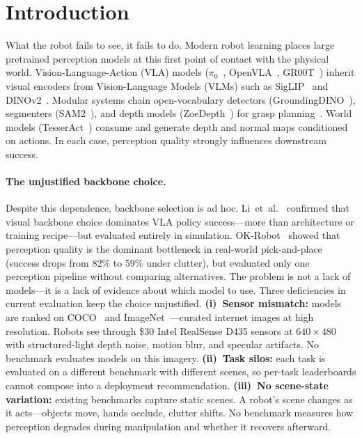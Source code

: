 \section{Introduction}
\label{sec:intro}

\noindent
What the robot fails to see, it fails to do.
Modern robot learning places large pretrained perception models at this first point of contact with the physical world.
Vision-Language-Action (VLA) models ($\pi_0$~\citep{black2024pi0}, OpenVLA~\citep{kim2024openvla}, GR00T~\citep{bjorck2025gr00t}) inherit visual encoders from Vision-Language Models (VLMs) such as SigLIP~\citep{zhai2023siglip} and DINOv2~\citep{oquab2023dinov2}.
Modular systems chain open-vocabulary detectors (GroundingDINO~\citep{liu2024groundingDINO}), segmenters (SAM2~\citep{ravi2024sam2}), and depth models (ZoeDepth~\citep{bhat2023zoedepth}) for grasp planning~\citep{liu2024okrobot, ze2024dp3}.
World models (TesserAct~\citep{zhen2025tesseract}) consume and generate depth and normal maps conditioned on actions.
In each case, perception quality strongly influences downstream success.

\paragraph{The unjustified backbone choice.}
Despite this dependence, backbone selection is ad hoc.
Li~et~al.~\citep{li2025robovlms} confirmed that visual backbone choice dominates VLA policy success---more than architecture or training recipe---but evaluated entirely in simulation.
OK-Robot~\citep{liu2024okrobot} showed that perception quality is the dominant bottleneck in real-world pick-and-place (success drops from 82\% to 59\% under clutter), but evaluated only one perception pipeline without comparing alternatives.
The problem is not a lack of models---it is a lack of evidence about which model to use.
Three deficiencies in current evaluation keep the choice unjustified.
\textbf{(i)~Sensor mismatch:} models are ranked on COCO~\citep{lin2014coco} and ImageNet~\citep{deng2009imagenet}---curated internet images at high resolution. Robots see through \$30 Intel RealSense D435 sensors at $640\!\times\!480$ with structured-light depth noise, motion blur, and specular artifacts. No benchmark evaluates models on this imagery.
\textbf{(ii)~Task silos:} each task is evaluated on a different benchmark with different scenes, so per-task leaderboards cannot compose into a deployment recommendation.
\textbf{(iii)~No scene-state variation:} existing benchmarks capture static scenes. A robot's scene changes as it acts---objects move, hands occlude, clutter shifts. No benchmark measures how perception degrades during manipulation and whether it recovers afterward.

